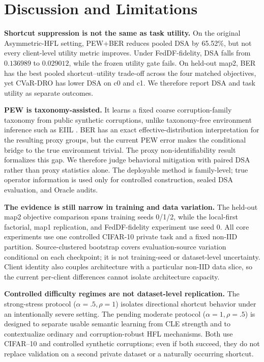\section{Discussion and Limitations}

\textbf{Shortcut suppression is not the same as task utility.} On the original Asymmetric-HFL setting, PEW+BER reduces pooled DSA by 65.52\%, but not every client-level utility metric improves. Under FedDF-fidelity, DSA falls from \(0.136989\) to \(0.029012\), while the frozen utility gate fails. On held-out map2, BER has the best pooled shortcut--utility trade-off across the four matched objectives, yet CVaR-DRO has lower DSA on c0 and c1. We therefore report DSA and task utility as separate outcomes.

\textbf{PEW is taxonomy-assisted.} It learns a fixed coarse corruption-family taxonomy from public synthetic corruptions, unlike taxonomy-free environment inference such as EIIL \citep{creager2021eiil}. BER has an exact effective-distribution interpretation for the resulting proxy groups, but the current PEW error makes the conditional bridge to the true environment trivial. The proxy non-identifiability result formalizes this gap. We therefore judge behavioral mitigation with paired DSA rather than proxy statistics alone. The deployable method is family-level; true operator information is used only for controlled construction, sealed DSA evaluation, and Oracle audits.

\textbf{The evidence is still narrow in training and data variation.} The held-out map2 objective comparison spans training seeds 0/1/2, while the local-first factorial, map1 replication, and FedDF-fidelity experiment use seed 0. All core experiments use one controlled CIFAR-10 private task and a fixed non-IID partition. Source-clustered bootstrap covers evaluation-source variation conditional on each checkpoint; it is not training-seed or dataset-level uncertainty.   Client identity also couples architecture with a particular non-IID data slice, so the current per-client differences cannot isolate architecture capacity.

\textbf{Controlled difficulty regimes are not dataset-level replication.} The strong-stress protocol ($\alpha=.5,\rho=1$) isolates directional shortcut behavior under an intentionally severe setting. The pending moderate protocol ($\alpha=1,\rho=.5$) is designed to separate usable semantic learning from CLE strength and to contextualize ordinary and corruption-robust HFL mechanisms. Both use CIFAR--10 and controlled synthetic corruptions; even if both succeed, they do not replace validation on a second private dataset or a naturally occurring shortcut.
